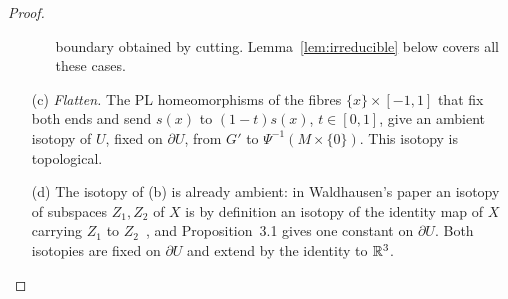 \begin{proof}
\begin{enumerate}
\begin{itemize}
  boundary obtained by cutting. Lemma~\ref{lem:irreducible} below covers all these cases.
  \end{itemize}
\item[(c)] \emph{Flatten.} The PL homeomorphisms of the fibres $\{x\}\times[-1,1]$ that fix both ends and send $s(x)$
to $(1-t)s(x)$, $t\in[0,1]$, give an ambient isotopy of $U$, fixed on $\partial U$, from $G'$ to
$\Psi^{-1}(M\times\{0\})$. This isotopy is topological.
\item[(d)] The isotopy of (b) is already ambient: in Waldhausen's paper an isotopy of subspaces $Z_1,Z_2$ of $X$ is by
definition an isotopy of the identity map of $X$ carrying $Z_1$ to $Z_2$~\cite[p.~57]{Waldhausen68}, and Proposition~3.1
gives one constant on $\partial U$. Both isotopies are fixed on $\partial U$ and extend by the identity to $\mathbb{R}^3$.
\end{enumerate}
\end{proof}

